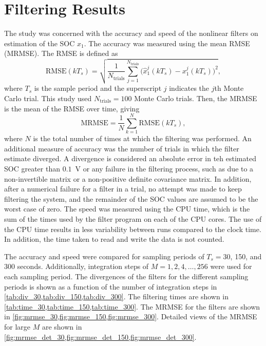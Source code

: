 \documentclass[../zhang_thesis.tex]{subfiles}
\begin{document}
\chapter{Filtering Results}


The study was concerned with the accuracy and speed of the nonlinear filters on estimation of the SOC $x_1$. The accuracy was measured using the mean RMSE (MRMSE). The RMSE is defined as
\begin{equation}
    \mathrm{RMSE}(kT_s) = \sqrt{ \frac{1}{N_\text{trials}} \sum_{j=1}^{N_\text{trials}} \Big( \hat{x}_1^j(kT_s) - x_1^j(kT_s) \Big)^2 },
\end{equation}
where $T_s$ is the sample period and the superscript $j$ indicates the $j$th Monte Carlo trial. This study used $N_\text{trials}=100$ Monte Carlo trials. Then, the MRMSE is the mean of the RMSE over time, giving
\begin{equation}
    \mathrm{MRMSE} = \frac{1}{N} \sum_{k=1}^N \mathrm{RMSE}(kT_s),
\end{equation}
where $N$ is the total number of times at which the filtering was performed. An additional measure of accuracy was the number of trials in which the filter estimate diverged. A divergence is considered an absolute error in teh estimated SOC greater than $0.1$~V or any failure in the filtering process, such as due to a non-invertible matrix or a non-positive definite covariance matrix. In addition, after a numerical failure for a filter in a trial, no attempt was made to keep filtering the
system, and the remainder of the SOC values are assumed to be the worst case of zero. The speed was measured using the CPU time, which is the sum of the times used by the filter program on each of the CPU cores. The use of the CPU time results in less variability between runs compared to the clock time. In addition, the time taken to read and write the data is not counted.

The accuracy and speed were compared for sampling periods of $T_s=30$, 150, and 300 seconds. Additionally, integration steps of $M=1,2,4,\dots,256$ were used for each sampling period. The divergences of the filters for the different sampling periods is shown as a function of the number of integration steps in \cref{tab:div_30,tab:div_150,tab:div_300}. The filtering times are shown in \cref{tab:time_30,tab:time_150,tab:time_300}. The MRMSE for the
filters are shown in \cref{fig:mrmse_30,fig:mrmse_150,fig:mrmse_300}. Detailed views of the MRMSE for large $M$ are shown in \cref{fig:mrmse_det_30,fig:mrmse_det_150,fig:mrmse_det_300}.
\end{document}
